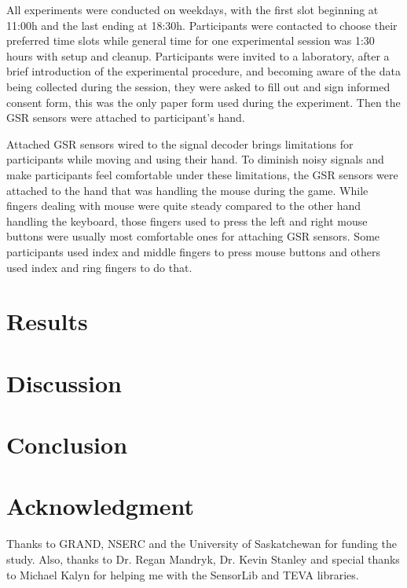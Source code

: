 \documentclass[conference]{include/IEEEtran}
\begin{document}
All experiments were conducted on weekdays, with the first slot beginning at 11:00h and the last ending at 18:30h. Participants were contacted to choose their preferred time slots while general time for one experimental session was 1:30 hours with setup and cleanup. Participants were invited to a laboratory, after a brief introduction of the experimental procedure, and becoming aware of the data being collected during the session, they were asked to fill out and sign informed consent form, this was the only paper form used during the experiment. Then the GSR sensors were attached to participant's hand.

Attached GSR sensors wired to the signal decoder brings limitations for participants while moving and using their hand. To diminish noisy signals and make participants feel comfortable under these limitations, the GSR sensors were attached to the hand that was handling the mouse during the game. While fingers dealing with mouse were quite steady compared to the other hand handling the keyboard, those fingers used to press the left and right mouse buttons were usually most comfortable ones for attaching GSR sensors. Some participants used index and middle fingers to press mouse buttons and others used index and ring fingers to do that.


\section{Results}
\label{sec:res}


\section{Discussion}
\label{sec:discus}


\section{Conclusion}
\label{sec:conclusion}


\section*{Acknowledgment}
Thanks to GRAND, NSERC and the University of Saskatchewan for funding the study. Also, thanks to Dr. Regan Mandryk, Dr. Kevin Stanley and special thanks to Michael Kalyn for helping me with the SensorLib and TEVA libraries.



  
\end{document}
